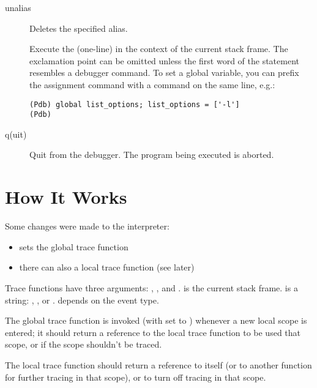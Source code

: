 \begin{description}
\item[unalias ]

Deletes the specified alias.

\item[\optional{!}]

Execute the (one-line)  in the context of
the current stack frame.
The exclamation point can be omitted unless the first word
of the statement resembles a debugger command.
To set a global variable, you can prefix the assignment
command with a  command on the same line, e.g.:

\begin{verbatim}
(Pdb) global list_options; list_options = ['-l']
(Pdb)
\end{verbatim}

\item[q(uit)]

Quit from the debugger.
The program being executed is aborted.

\end{description}

\section{How It Works}

Some changes were made to the interpreter:

\begin{itemize}
\item {} sets the global trace function
\item there can also a local trace function (see later)
\end{itemize}

Trace functions have three arguments: , , and
.  is the current stack frame.   is a
string: , ,  or
.   depends on the event type.

The global trace function is invoked (with  set to
) whenever a new local scope is entered; it should return
a reference to the local trace function to be used that scope, or
 if the scope shouldn't be traced.

The local trace function should return a reference to itself (or to
another function for further tracing in that scope), or  to
turn off tracing in that scope.

